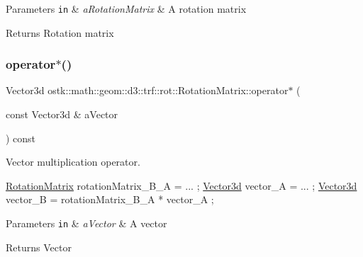 \begin{DoxyParams}[1]{Parameters}
\mbox{\tt in}  & {\em a\+Rotation\+Matrix} & A rotation matrix \\
\hline
\end{DoxyParams}
\begin{DoxyReturn}{Returns}
Rotation matrix 
\end{DoxyReturn}
\mbox{\label{classostk_1_1math_1_1geom_1_1d3_1_1trf_1_1rot_1_1_rotation_matrix_a465bbadfbf1b2dcd31f66250a8cdf02b}} 
\subsubsection{\texorpdfstring{operator$\ast$()}{operator*()}\hspace{0.1cm}{\footnotesize\ttfamily [2/2]}}
{\footnotesize\ttfamily Vector3d ostk\+::math\+::geom\+::d3\+::trf\+::rot\+::\+Rotation\+Matrix\+::operator$\ast$ (\begin{DoxyParamCaption}\item[{const Vector3d \&}]{a\+Vector }\end{DoxyParamCaption}) const}



Vector multiplication operator. 


\begin{DoxyCode}
\hyperlink{classostk_1_1math_1_1geom_1_1d3_1_1trf_1_1rot_1_1_rotation_matrix_a5e6bed0779ad7db0c5bf26b2bd96f8ba}{RotationMatrix} rotationMatrix\_B\_A = ... ;
\hyperlink{namespaceostk_1_1math_1_1obj_a18744cbf433bce59f6758d9fe3b1dff1}{Vector3d} vector\_A = ... ;
\hyperlink{namespaceostk_1_1math_1_1obj_a18744cbf433bce59f6758d9fe3b1dff1}{Vector3d} vector\_B = rotationMatrix\_B\_A * vector\_A ;
\end{DoxyCode}



\begin{DoxyParams}[1]{Parameters}
\mbox{\tt in}  & {\em a\+Vector} & A vector \\
\hline
\end{DoxyParams}
\begin{DoxyReturn}{Returns}
Vector 
\end{DoxyReturn}
\mbox{\label{classostk_1_1math_1_1geom_1_1d3_1_1trf_1_1rot_1_1_rotation_matrix_a4563aa90935b926d8c1c7829ca333941}} 
